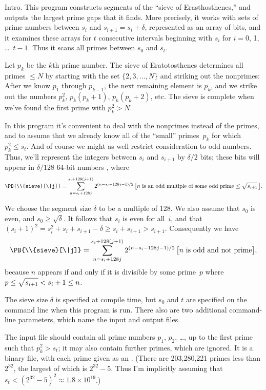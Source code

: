 
\datethis

Intro. This program constructs segments of the ``sieve of
Erasthosthenes,''
and outputs the largest prime gaps that it finds. More precisely, it
works with sets of prime numbers between $s_i$ and $s_{i+1}=s_i+\delta$,
represented as an array of bits, and it examines these arrays for
$t$ consecutive intervals beginning with $s_i$ for $i=0$, 1, \dots~$t-1$.
Thus it scans all primes between $s_0$ and $s_t$.

Let $p_k$ be the $k$th prime number. The sieve of Eratotosthenes determines
all primes $\le N$ by starting with the set $\{2,3,\ldots,N\}$ and striking
out the nonprimes: After we know $p_1$ through $p_{k-1}$, the next remaining
element is $p_k$, and we strike out the numbers $p_k^2$, $p_k(p_k+1)$,
$p_k(p_k+2)$, etc. The sieve is complete when we've found the
first prime with $p_k^2>N$.

In this program it's convenient to deal with the nonprimes instead of the
primes, and to assume that we already know all of the ``small'' primes~$p_k$
for which $p_k^2\le s_t$.
And of course we might as well restrict consideration to odd numbers.
Thus, we'll represent the integers between $s_i$ and $s_{i+1}$ by
$\delta/2$ bits; these bits will appear in $\delta/128$ 64-bit numbers
, where
$$\PB{\\{sieve}[\|j]}=\sum_{n=s_i+128j}^{s_i+128(j+1)} 2^{(n-s_i-128j-1)/2}
\,\hbox{$\bigl[n$ is an odd multiple of some odd prime
$\le\sqrt{\mathstrut s_{i+1}}\,\bigr]$}.$$

We choose the segment size $\delta$ to be a multiple of 128.
We also assume that $s_0$ is even, and $s_0\ge\sqrt\delta$. It follows
that $s_i$ is even for all~$i$, and that $(s_i+1)^2=s_i^2+s_i+s_{i+1}-\delta
\ge s_i+s_{i+1}>s_{i+1}$. Consequently we have
$$\PB{\\{sieve}[\|j]}=\sum_{n=s_i+128j}^{s_i+128(j+1)} 2^{(n-s_i-128j-1)/2}
\,\hbox{$\bigl[n$ is odd and not prime$\bigr]$},$$
because $n$ appears if and only if it is divisible by some prime~$p$
where $p\le\sqrt{\mathstrut s_{i+1}}<s_i+1\le n$.

\fi

The sieve size $\delta$ is specified at compile time,
but $s_0$ and $t$ are specified on the command line when this program
is run. There also are two additional command-line parameters,
which name the input and output files.

The input file should contain
all prime numbers $p_1$, $p_2$, \dots, up to the first prime such
that $p_k^2>s_t$; it may also contain further primes, which are ignored.
It is a binary file, with each prime given as an .
(There are 203,280,221 primes less than $2^{32}$, the largest of which
is $2^{32}-5$. Thus I'm implicitly assuming that $s_t<(2^{32}-5)^2
\approx 1.8\times10^{19}$.)

